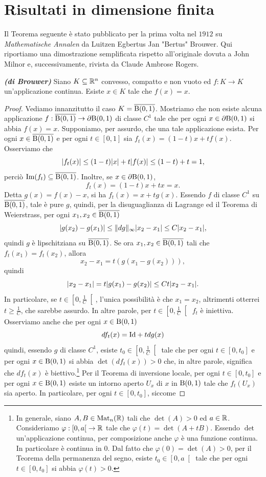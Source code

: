 \section{Risultati in dimensione finita}
Il Teorema seguente è stato pubblicato per la prima volta nel $1912$ su \emph{Mathematische Annalen} da Luitzen Egbertus Jan "Bertus" Brouwer. Qui riportiamo una dimostrazione semplificata rispetto all'originale dovuta a John Milnor e, successivamente, rivista da Claude Ambrose Rogers.
\begin{teorema}\emph{\textbf{(di Brouwer)}}
	Siano $K \subseteq \mathbb{R}^n$ convesso, compatto e non vuoto ed $f: K \to K$ un'applicazione continua. Esiste $x \in K$ tale che $f(x) = x$.
\end{teorema}
\begin{proof}
	Vediamo innanzitutto il caso $K = \overline{\textup{B}(0,1)}$. Mostriamo che non esiste alcuna applicazione $f: \overline{\textup{B}(0,1)} \to \partial \textup{B}(0,1)$ di classe $C^1$ tale che per ogni $x \in \partial \textup{B}(0,1)$ si abbia $f(x) = x$. Supponiamo, per assurdo, che una tale applicazione esista. Per ogni $x \in \overline{\textup{B}(0,1)}$ e per ogni $t \in [0,1]$ sia $f_t(x) = (1-t)x + tf(x)$. Osserviamo che
	\[ \lvert f_t(x)\rvert \le (1-t)\lvert x\rvert +t\lvert f(x)\rvert \le (1-t) +t = 1, \]
	perciò $\textup{Im}(f_t)\subseteq \overline{\textup{B}(0,1)}$. Inoltre, se $x \in \partial \textup{B}(0,1)$,
	\[ f_t(x) = (1-t)x + tx = x. \]
	Detta $g(x) = f(x) - x$, si ha $f_t(x) = x + tg(x)$. Essendo $f$ di classe $C^1$ su $\overline{\textup{B}(0,1)}$,  tale è pure $g$, quindi, per la disuguaglianza di Lagrange ed il Teorema di Weierstrass, per ogni $x_1,x_2 \in \overline{\textup{B}(0,1)}$
	\[ \lvert g(x_2) - g(x_1)\rvert \le \lVert dg\rVert_\infty \lvert x_2 - x_1\rvert \le C \lvert x_2 - x_1\rvert, \]
	quindi $g$ è lipschitziana su $\overline{\textup{B}(0,1)}$. Se ora $x_1,x_2 \in \overline{\textup{B}(0,1)}$ tali che $f_t(x_1) = f_t(x_2)$, allora 
	\[ x_2 - x_1 = t(g(x_1 - g(x_2))), \]
	quindi 
	\[ \lvert x_2 - x_1\rvert = t\lvert g(x_1) - g(x_2)\rvert \le Ct \lvert x_2 - x_1\rvert. \]
	In particolare, se $t \in \left[ 0,\frac{1}{C}\right[$, l'unica possibilità è che $x_1 = x_2$, altrimenti otterrei $t \ge \frac{1}{C}$, che sarebbe assurdo. In altre parole, per $t \in \left[ 0,\frac{1}{C}\right[$ $f_t$ è iniettiva. Osserviamo anche che per ogni $x \in \textup{B}(0,1)$
	\[ df_t(x) = \textup{Id} + tdg(x) \]
	quindi, essendo $g$ di classe $C^1$, esiste $t_0 \in  \left[ 0,\frac{1}{C}\right[$ tale che per ogni $t \in \left[ 0,t_0\right] $ e per ogni $x \in \textup{B}(0,1)$ si abbia $\det(df_t(x)) > 0$ che, in altre parole, significa che $df_t(x)$ è biettivo.\footnote{In generale, siano $A,B \in \textup{Mat}_n(\mathbb{R})$ tali che $\det(A) > 0$ ed $a \in \mathbb{R}$. Consideriamo $\varphi: \left[ 0, a\right[ \to \mathbb{R}$ tale che $\varphi(t) = \det(A + tB)$. Essendo $\det$ un'applicazione continua, per composizione anche $\varphi$ è una funzione continua. In particolare è continua in $0$. Dal fatto che $\varphi(0) = \det(A) > 0$, per il Teorema della permanenza del segno, esiste $t_0 \in  \left[ 0,a\right[$ tale che per ogni $t \in \left[ 0,t_0\right]$ si abbia $\varphi(t) > 0$.} Per il Teorema di inversione locale, per ogni $t \in \left[ 0,t_0\right]$ e per ogni $x \in \textup{B}(0,1)$ esiste un intorno aperto $U_x$ di $x$ in $\textup{B}(0,1)$ tale che $f_t(U_x)$ sia aperto. In particolare, per ogni $t \in \left[ 0,t_0\right] $, siccome

\end{proof}
